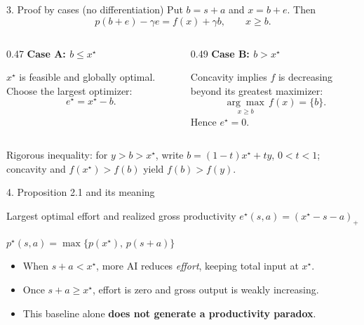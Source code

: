 \documentclass[aspectratio=169,11pt]{beamer}
\newcommand{\highlight}[1]{{\color{accent}\bfseries #1}}
\begin{document}
\begin{frame}{3. Proof by cases (no differentiation)}
  \large
  Put $b=s+a$ and $x=b+e$. Then
  \[
    p(b+e)-\gamma e = f(x)+\gamma b,\qquad x\geq b.
  \]
  \vspace{0.12cm}
  \begin{columns}[T,onlytextwidth]
    \begin{column}{0.47\textwidth}
      \highlight{Case A: $b\leq x^\star$}
      \vspace{0.18cm}
      \par $x^\star$ is feasible and globally optimal. Choose the largest optimizer:
      \[
        e^\star=x^\star-b.
      \]
    \end{column}
    \begin{column}{0.49\textwidth}
      \highlight{Case B: $b>x^\star$}
      \vspace{0.18cm}
      \par Concavity implies $f$ is decreasing beyond its greatest maximizer:
      \[
        \underset{x\geq b}{\arg\max}\, f(x)=\{b\}.
      \]
      Hence $e^\star=0$.
    \end{column}
  \end{columns}
  \vspace{0.18cm}
  \par\normalsize Rigorous inequality: for $y>b>x^\star$, write $b=(1-t)x^\star+ty$, $0<t<1$; concavity and $f(x^\star)>f(b)$ yield $f(b)>f(y)$.
\end{frame}

\begin{frame}{4. Proposition 2.1 and its meaning}
  \begin{block}{Largest optimal effort and realized gross productivity}
    \centering\Large
    $\displaystyle e^\star(s,a)=(x^\star-s-a)_+$\par\medskip
    $\displaystyle p^\star(s,a)=\max\{p(x^\star),\,p(s+a)\}$
  \end{block}
  \vspace{0.28cm}
  \large
  \begin{itemize}
  \setlength\itemsep{0.23cm}
  \item When $s+a<x^\star$, more AI reduces \emph{effort}, keeping total input at $x^\star$.
  \item Once $s+a\geq x^\star$, effort is zero and gross output is weakly increasing.
  \item This baseline alone \highlight{does not generate a productivity paradox}.
  \end{itemize}
\end{frame}
\end{document}
